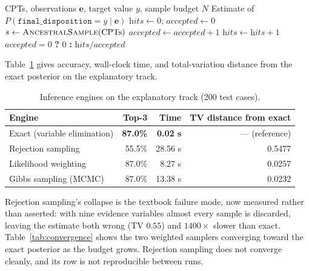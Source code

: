 \documentclass[11pt]{article}
\newcommand{\dispo}{\texttt{final\_disposition}}
\begin{document}
\begin{algorithm}[t]
\caption{Rejection sampling (retained for comparison)}
\begin{algorithmic}[1]
\Require CPTs, observations $\mathbf{e}$, target value $y$, sample budget $N$
\Ensure Estimate of $P(\dispo = y \mid \mathbf{e})$
\State $\textit{hits} \gets 0$; \quad $\textit{accepted} \gets 0$
  \State $s \gets \Call{AncestralSample}{\text{CPTs}}$
    \State $\textit{accepted} \gets \textit{accepted} + 1$
    \If{$s[\dispo] = y$} $\textit{hits} \gets \textit{hits} + 1$ \EndIf
  \EndIf
\EndFor
\State \Return $\textit{accepted} = 0$ \textbf{?} $0$ \textbf{:} $\textit{hits}/\textit{accepted}$
\end{algorithmic}
\end{algorithm}

Table~\ref{tab:engines} gives accuracy, wall-clock time, and total-variation
distance from the exact posterior on the explanatory track.

\begin{table}[t]
\centering
\caption{Inference engines on the explanatory track (200 test cases).}
\label{tab:engines}
\begin{tabular}{lrrr}
\toprule
Engine & Top-3 & Time & TV distance from exact \\
\midrule
Exact (variable elimination) & \textbf{87.0\%} & \textbf{0.02 s} & --- (reference) \\
Rejection sampling           & 55.5\% & 28.56 s & 0.5477 \\
Likelihood weighting         & 87.0\% & 8.27 s  & 0.0257 \\
Gibbs sampling (MCMC)        & 87.0\% & 13.38 s & 0.0232 \\
\bottomrule
\end{tabular}
\end{table}

Rejection sampling's collapse is the textbook failure mode, now measured rather
than asserted: with nine evidence variables almost every sample is discarded,
leaving the estimate both wrong (TV $0.55$) and $1400\times$ slower than exact.
Table~\ref{tab:convergence} shows the two weighted samplers converging toward the
exact posterior as the budget grows. Rejection sampling does not converge cleanly,
and its row is not reproducible between runs.
\end{document}

